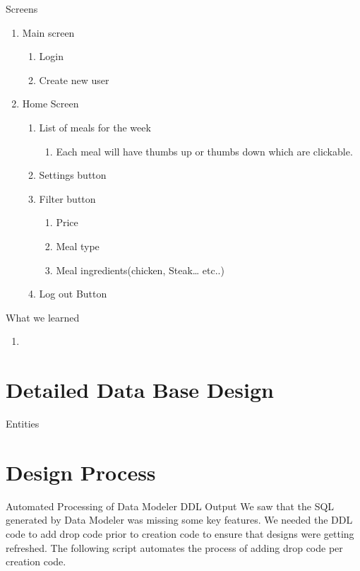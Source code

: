 \documentclass[a4paper,10pt,toc=graduated]{article}
\begin{document}
 
\begin{mySubsection}{Screens}
\renewcommand{\labelenumi}{\arabic{enumi}. }
\renewcommand{\labelenumii}{\arabic{enumi}.\arabic{enumii}. }
\renewcommand{\labelenumiii}{\arabic{enumi}.\arabic{enumii}.\arabic{enumiii}. }
\renewcommand{\labelenumiv}{\arabic{enumi}.\arabic{enumii}.\arabic{enumiii}. }
\renewcommand{\labelenumiv}{\arabic{enumi}.\arabic{enumii}.\arabic{enumiii}.\arabic{enumiv}. }
\begin{enumerate}
\item
Main screen
\begin{enumerate}
\item
Login
\item
Create new user
\end{enumerate}
\item
Home Screen
\begin{enumerate}
\item
List of meals for the week
\begin{enumerate}
\item
Each meal will have thumbs up or thumbs down which are clickable.
\end{enumerate}
\item
Settings button
\item
Filter button
\begin{enumerate}
\item
Price
\item
Meal type
\item
Meal ingredients(chicken, Steak… etc..)
\end{enumerate}
\item
Log out Button
\end{enumerate}
\end{enumerate}
\end{mySubsection}
\begin{mySubsection}{What we learned}
\begin{enumerate}
\item 
\end{enumerate}
\end{mySubsection}
\section{Detailed Data Base Design}
\begin{mySubsection}{Entities}

\end{mySubsection}
\section{Design Process}
\begin{mySubsection}{Automated Processing of Data Modeler DDL Output}
We saw that the SQL generated by Data Modeler was missing some key features. We needed the DDL code to add drop code prior to creation code to ensure that designs were getting refreshed. The following script automates the process of adding drop code per creation code.
\newline
\end{mySubsection}
\end{document}
